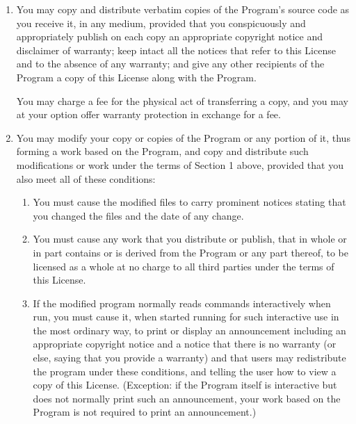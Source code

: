\documentclass{book}
\begin{document}
{\begin{enumerate}
\item You may copy and distribute verbatim copies of the Program's source
  code as you receive it, in any medium, provided that you conspicuously
  and appropriately publish on each copy an appropriate copyright notice
  and disclaimer of warranty; keep intact all the notices that refer to
  this License and to the absence of any warranty; and give any other
  recipients of the Program a copy of this License along with the Program.

You may charge a fee for the physical act of transferring a copy, and you
may at your option offer warranty protection in exchange for a fee.

\item

You may modify your copy or copies of the Program or any portion
of it, thus forming a work based on the Program, and copy and
distribute such modifications or work under the terms of Section 1
above, provided that you also meet all of these conditions:

\begin{enumerate}

\item 

You must cause the modified files to carry prominent notices stating that
you changed the files and the date of any change.

\item

You must cause any work that you distribute or publish, that in
whole or in part contains or is derived from the Program or any
part thereof, to be licensed as a whole at no charge to all third
parties under the terms of this License.

\item
If the modified program normally reads commands interactively
when run, you must cause it, when started running for such
interactive use in the most ordinary way, to print or display an
announcement including an appropriate copyright notice and a
notice that there is no warranty (or else, saying that you provide
a warranty) and that users may redistribute the program under
these conditions, and telling the user how to view a copy of this
License.  (Exception: if the Program itself is interactive but
does not normally print such an announcement, your work based on
the Program is not required to print an announcement.)

\end{enumerate}



\end{enumerate}}
\end{document}
